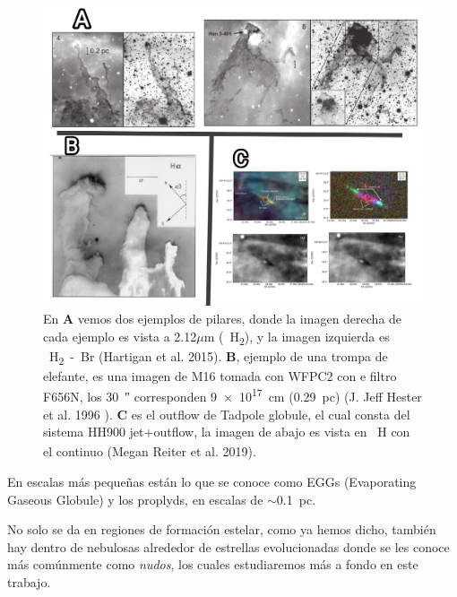 \documentclass{book}
\begin{document}
\begin{figure}[h]
    \centering
    \includegraphics[width=1 \textwidth]{images Chapter 1/C1_Pillars.jpg}
    \caption{En \textbf{A} vemos dos ejemplos de pilares, donde la imagen derecha de cada ejemplo es vista a 2.12$\mu$m (\SI{}{H_2}), y la imagen izquierda es \SI{}{H_2-Br_{\gamma}} (Hartigan et al. 2015). \textbf{B}, ejemplo de una trompa de elefante, es una imagen de M16 tomada con WFPC2 con e filtro F656N, los \SI{30}{\arcsecond} corresponden \SI{9e17}{cm} (\SI{0.29}{pc}) (J. Jeff Hester et al. 1996 ). \textbf{C} es el outflow de Tadpole globule, el cual consta del sistema HH900 jet+outflow, la imagen de abajo es vista en \SI{}{H_\alpha} con el continuo 
    (Megan Reiter et al. 2019). }
    \label{fig:zones}
\end{figure}

En escalas más pequeñas están lo que se conoce como EGGs (Evaporating Gaseous Globule) y los proplyds, en escalas de $\sim$\SI{0.1}{pc}. 

No solo se da en regiones de formación estelar, como ya hemos dicho, también hay dentro de nebulosas alrededor de estrellas evolucionadas donde se les conoce más comúnmente como \textit{nudos}, los cuales estudiaremos más a fondo en este trabajo.
\end{document}
